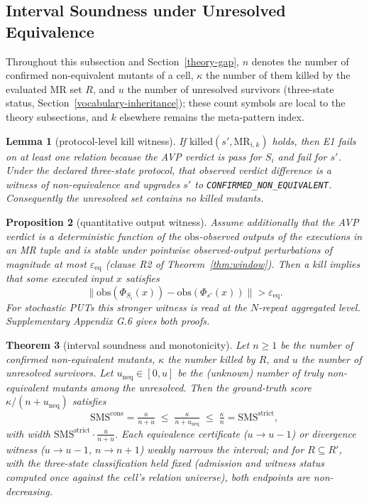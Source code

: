 \documentclass[review,12pt,authoryear]{elsarticle}
\newtheorem{theorem}{Theorem}
\newtheorem{proposition}[theorem]{Proposition}
\newtheorem{lemma}[theorem]{Lemma}
\begin{document}
\subsection{Interval Soundness under Unresolved Equivalence}\label{theory-interval}

Throughout this subsection and Section~\ref{theory-gap}, $n$ denotes the
number of confirmed non-equivalent mutants of a cell, $\kappa$ the
number of them killed by the evaluated MR set $R$, and $u$ the number of
unresolved survivors (three-state status,
Section~\ref{vocabulary-inheritance}); these count symbols are local to
the theory subsections, and $k$ elsewhere remains the meta-pattern
index.

\begin{lemma}[protocol-level kill witness]\label{lem:witness}
If $\mathrm{killed}(s', \mathrm{MR}_{i,k})$ holds, then E1 fails on at
least one relation because the AVP verdict is pass for \(S_i\) and fail
for \(s'\). Under the declared three-state protocol, that observed
verdict difference is a witness of non-equivalence and upgrades \(s'\)
to \texttt{CONFIRMED\_NON\_EQUIVALENT}. Consequently the unresolved set
contains no killed mutants.
\end{lemma}

\begin{proposition}[quantitative output witness]\label{prop:output-witness}
Assume additionally that the AVP verdict is a deterministic function of
the $\mathrm{obs}$-observed outputs of the executions in an MR tuple and
is stable under pointwise observed-output perturbations of magnitude at
most $\varepsilon_{\mathrm{eq}}$ (clause R2 of
Theorem~\ref{thm:window}). Then a kill implies that some executed input
\(x\) satisfies
\[
\|\mathrm{obs}(\Phi_{S_i}(x)) -
  \mathrm{obs}(\Phi_{s'}(x))\| > \varepsilon_{\mathrm{eq}}.
\]
For stochastic PUTs this stronger witness is read at the \(N\)-repeat
aggregated level. Supplementary Appendix G.6 gives both proofs.
\end{proposition}

\begin{theorem}[interval soundness and monotonicity]\label{thm:interval}
Let $n \geq 1$ be the number of confirmed non-equivalent mutants,
$\kappa$ the number killed by $R$, and $u$ the number of unresolved
survivors. Let $u_{\mathrm{neq}} \in [0, u]$ be the (unknown) number of
truly non-equivalent mutants among the unresolved. Then the ground-truth
score $\kappa/(n + u_{\mathrm{neq}})$ satisfies
\[ \mathrm{SMS}^{\mathrm{cons}} = \tfrac{\kappa}{n+u} \;\leq\; \tfrac{\kappa}{n+u_{\mathrm{neq}}} \;\leq\; \tfrac{\kappa}{n} = \mathrm{SMS}^{\mathrm{strict}}, \]
with width $\mathrm{SMS}^{\mathrm{strict}} \cdot \tfrac{u}{n+u}$. Each
equivalence certificate ($u \to u-1$) or divergence witness
($u \to u-1$, $n \to n+1$) weakly narrows the interval; and for
$R \subseteq R'$, with the three-state classification held fixed
(admission and witness status computed once against the cell's relation
universe), both endpoints are non-decreasing.
\end{theorem}
\end{document}
